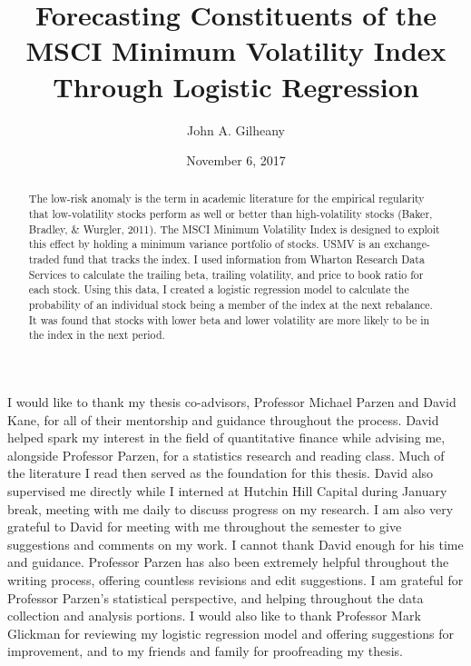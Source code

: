 \documentclass[12pt,twoside]{reedthesis}
\title{Forecasting Constituents of the MSCI Minimum Volatility Index Through
Logistic Regression}
\author{John A. Gilheany}
\date{November 6, 2017}
\theoremstyle{definition}
\theoremstyle{definition}
\theoremstyle{definition}
\theoremstyle{remark}
\begin{document}
  \maketitle

\frontmatter %
\pagestyle{empty} %
  \begin{acknowledgements}
    I would like to thank my thesis co-advisors, Professor Michael Parzen
    and David Kane, for all of their mentorship and guidance throughout the
    process. David helped spark my interest in the field of quantitative
    finance while advising me, alongside Professor Parzen, for a statistics
    research and reading class. Much of the literature I read then served as
    the foundation for this thesis. David also supervised me directly while
    I interned at Hutchin Hill Capital during January break, meeting with me
    daily to discuss progress on my research. I am also very grateful to
    David for meeting with me throughout the semester to give suggestions
    and comments on my work. I cannot thank David enough for his time and
    guidance. Professor Parzen has also been extremely helpful throughout
    the writing process, offering countless revisions and edit suggestions.
    I am grateful for Professor Parzen's statistical perspective, and
    helping throughout the data collection and analysis portions. I would
    also like to thank Professor Mark Glickman for reviewing my logistic
    regression model and offering suggestions for improvement, and to my
    friends and family for proofreading my thesis.
  \end{acknowledgements}

  \hypersetup{linkcolor=black}
  \setcounter{tocdepth}{2}
  \tableofcontents

  \listoftables

  \listoffigures
  \begin{abstract}
    The low-risk anomaly is the term in academic literature for the
    empirical regularity that low-volatility stocks perform as well or
    better than high-volatility stocks (Baker, Bradley, \& Wurgler, 2011).
    The MSCI Minimum Volatility Index is designed to exploit this effect by
    holding a minimum variance portfolio of stocks. USMV is an
    exchange-traded fund that tracks the index. I used information from
    Wharton Research Data Services to calculate the trailing beta, trailing
    volatility, and price to book ratio for each stock. Using this data, I
    created a logistic regression model to calculate the probability of an
    individual stock being a member of the index at the next rebalance. It
    was found that stocks with lower beta and lower volatility are more
    likely to be in the index in the next period.
  \end{abstract}
\end{document}
